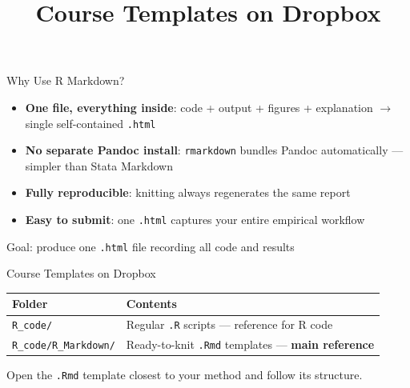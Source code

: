 \documentclass[dvipsnames,hyperref={pdfpagelabels=false}]{beamer}
\begin{document}
\begin{frame}{Why Use R Markdown?}
  \begin{itemize}
    \item \textbf{One file, everything inside}: code + output + figures + explanation
          $\to$ single self-contained \texttt{.html}
    \item \textbf{No separate Pandoc install}: \texttt{rmarkdown} bundles Pandoc
          automatically --- simpler than Stata Markdown
    \item \textbf{Fully reproducible}: knitting always regenerates the same report
    \item \textbf{Easy to submit}: one \texttt{.html} captures your entire empirical workflow
  \end{itemize}

  \vspace{1em}
  \begin{center}
    \alert{Goal: produce one \texttt{.html} file recording all code and results}
  \end{center}
\end{frame}

\title[]{Course Templates on Dropbox}
\author{}\institute{}\date{}
\begin{frame}{}
  \titlepage
\end{frame}

\begin{frame}{Course Templates on Dropbox}
  \begin{center}
    \begin{tabular}{ll}
      \toprule
      \textbf{Folder} & \textbf{Contents} \\
      \midrule
      \texttt{R\_code/} & Regular \texttt{.R} scripts --- reference for R code \\
      \texttt{R\_code/R\_Markdown/} & Ready-to-knit \texttt{.Rmd} templates --- \textbf{main reference} \\
      \bottomrule
    \end{tabular}
  \end{center}

  \vspace{1em}
  Open the \texttt{.Rmd} template closest to your method and follow its structure.
\end{frame}
\end{document}
